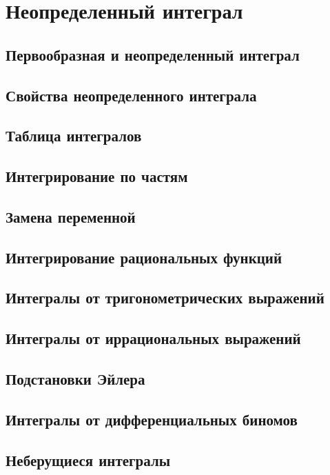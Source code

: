 \section{Неопределенный интеграл}
\subsection{Первообразная и неопределенный интеграл}

\subsection{Свойства неопределенного интеграла}

\subsection{Таблица интегралов}

\subsection{Интегрирование по частям}

\subsection{Замена переменной}

\subsection{Интегрирование рациональных функций}
\subsection{Интегралы от тригонометрических выражений}

\subsection{Интегралы от иррациональных выражений}

\subsection{Подстановки Эйлера}

\subsection{Интегралы от дифференциальных биномов}
 
\subsection{Неберущиеся интегралы}


